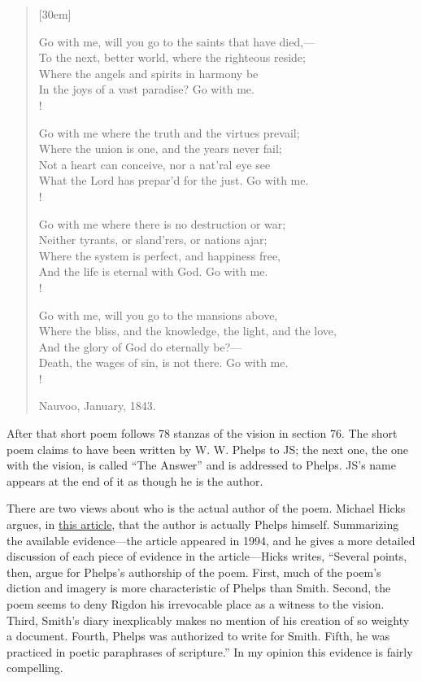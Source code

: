 			\begin{verse}[30em]
			
			Go with me, will you go to the saints that have died,--- \\
			To the next, better world, where the righteous reside; \\
			Where the angels and spirits in harmony be \\
			In the joys of a vast paradise? Go with me. \\!
			 
			Go with me where the truth and the virtues prevail; \\
			Where the union is one, and the years never fail; \\
			Not a heart can conceive, nor a nat'ral eye see \\
			What the Lord has prepar'd for the just. Go with me. \\!
			 
			Go with me where there is no destruction or war; \\
			Neither tyrants, or sland'rers, or nations ajar; \\
			Where the system is perfect, and happiness free, \\
			And the life is eternal with God. Go with me. \\!
			 
			Go with me, will you go to the mansions above, \\
			Where the bliss, and the knowledge, the light, and the love, \\
			And the glory of God do eternally be?--- \\
			Death, the wages of sin, is not there. Go with me. \\!
			
			Nauvoo, January, 1843.
			
			\end{verse}
			
			\noindent After that short poem follows 78 stanzas of the vision in section 76. The short poem claims to have been written by W. W. Phelps to JS; the next one, the one with the vision, is called ``The Answer'' and is addressed to Phelps. JS's name appears at the end of it as though he is the author.
				
			There are two views about who is the actual author of the poem. Michael Hicks argues, in \href{https://drive.google.com/file/d/1B0m3bVCMdsS1LdIjsq3HEY8yJ8l90GX1/view?usp=sharing}{this article}, that the author is actually Phelps himself. Summarizing the available evidence---the article appeared in 1994, and he gives a more detailed discussion of each piece of evidence in the article---Hicks writes, ``Several points, then, argue for Phelps's authorship of the poem. First, much of the poem's diction and imagery is more characteristic of Phelps than Smith. Second, the poem seems to deny Rigdon his irrevocable place as a witness to the vision. Third, Smith's diary inexplicably makes no mention of his creation of so weighty a document. Fourth, Phelps was authorized to write for Smith. Fifth, he was practiced in poetic paraphrases of scripture.'' In my opinion this evidence is fairly compelling.
				
